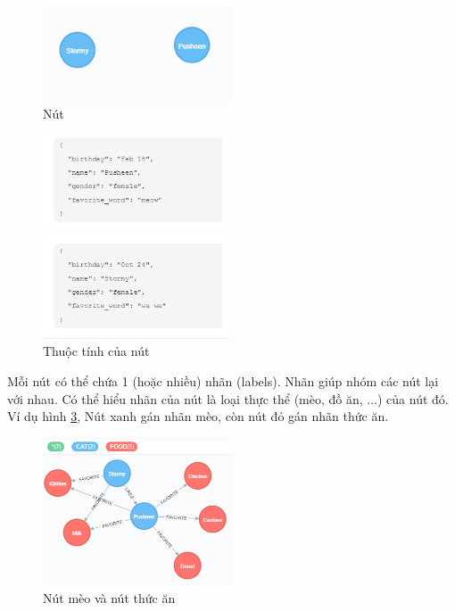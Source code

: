 \begin{figure}[h]
\centering
\includegraphics[width=0.5\textwidth]{image/node.PNG}
\caption{\label{fig:node} Nút}
\end{figure}

\begin{figure}[h]
\centering
\includegraphics[width=0.5\textwidth]{image/thuoc_tinh.PNG}
\caption{\label{fig:node} Thuộc tính của nút}
\end{figure}

Mỗi nút có thể chứa 1 (hoặc nhiều) nhãn (labels). Nhãn giúp nhóm các nút lại với nhau. Có thể hiểu nhãn của nút là loại thực thể (mèo, đồ ăn, ...) của nút đó. Ví dụ hình \ref{fig:catfoodnode}, Nút xanh gán nhãn mèo, còn nút đỏ gán nhãn thức ăn.

\begin{figure}[h]
\centering
\includegraphics[width=0.5\textwidth]{image/complete_node_with_cat_and_food.PNG}
\caption{\label{fig:catfoodnode} Nút mèo và nút thức ăn}
\end{figure}


